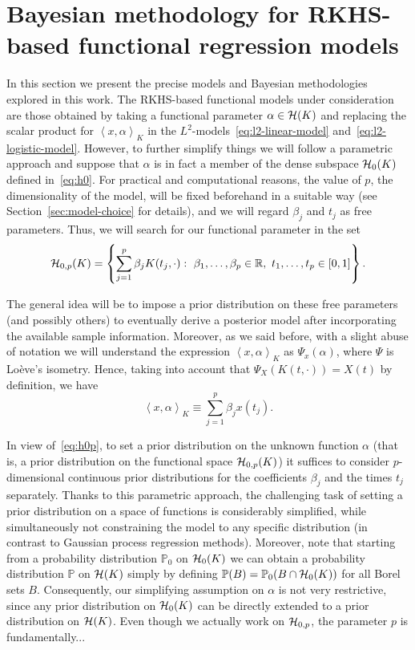 \documentclass[ba]{imsart}
\numberwithin{equation}{section}
\theoremstyle{plain}
\newcommand{\R}{\mathbb{R}}
\newcommand{\Hcal}{\ensuremath\mathcal{H}}
\newcommand\dotprod[2]{\left\langle #1, #2 \right\rangle}
\begin{document}
\section{Bayesian methodology for RKHS-based functional regression models}\label{sec:methodology}

In this section we present the precise models and Bayesian methodologies explored in this work. The RKHS-based functional models under consideration are those obtained by taking a functional parameter \(\alpha \in \Hcal(K)\) and replacing the scalar product for \(\dotprod{x}{\alpha}_K\) in the \(L^2\)-models~\eqref{eq:l2-linear-model} and~\eqref{eq:l2-logistic-model}. However, to further simplify things we will follow a parametric approach and suppose that \(\alpha\) is in fact a member of the dense subspace \(\Hcal_0(K)\) defined in~\eqref{eq:h0}. For practical and computational reasons, the value of \(p\), the dimensionality of the model, will be fixed beforehand in a suitable way (see Section~\ref{sec:model-choice} for details), and we will regard \(\beta_j\) and \(t_j\) as free parameters. Thus, we will search for our functional parameter in the set
\begin{equation}\label{eq:h0p}
\Hcal_{0,p}(K)=\left\{ \sum_{j=1}^p \beta_j K(t_j, \cdot): \ \beta_1,\dots,\beta_p \in \R, \ t_1,\dots,t_p \in [0, 1]\right\}.
\end{equation}

The general idea will be to impose a prior distribution on these free parameters (and possibly others) to eventually derive a posterior model after incorporating the available sample information.  Moreover, as we said before, with a slight abuse of notation we will understand the expression \(\dotprod{x}{\alpha}_K\) as \(\Psi_x(\alpha)\), where \(\Psi\) is Loève's isometry. Hence, taking into account that \(\Psi_X(K(t, \cdot)) = X(t)\) by definition, we have
\[
\dotprod{x}{\alpha}_K \equiv \sum_{j=1}^p \beta_j x(t_j).
\]

In view of~\eqref{eq:h0p}, to set a prior distribution on the unknown function \(\alpha\) (that is, a prior distribution on the functional space \(\Hcal_{0,p}(K)\)) it suffices to consider \(p\)-dimensional continuous prior distributions for the coefficients \(\beta_j\) and the times \(t_j\) separately. Thanks to this parametric approach, the challenging task of setting a prior distribution on a space of functions is considerably simplified, while simultaneously not constraining the model to any specific distribution (in contrast to Gaussian process regression methods). Moreover, note that starting from a probability distribution \(\mathbb{P}_0\) on \(\Hcal_0(K)\) we can obtain a probability distribution \(\mathbb{P}\) on \(\Hcal(K)\) simply by defining \(\mathbb{P}(B) = \mathbb{P}_0(B\cap \Hcal_0(K))\) for all Borel sets \(B\). Consequently, our simplifying assumption on \(\alpha\) is not very restrictive, since any prior distribution on \(\Hcal_0(K)\) can be directly extended to a prior distribution on \(\Hcal(K)\). Even though we actually work on \(\Hcal_{0,p}\), the parameter \(p\) is fundamentally...
\end{document}
